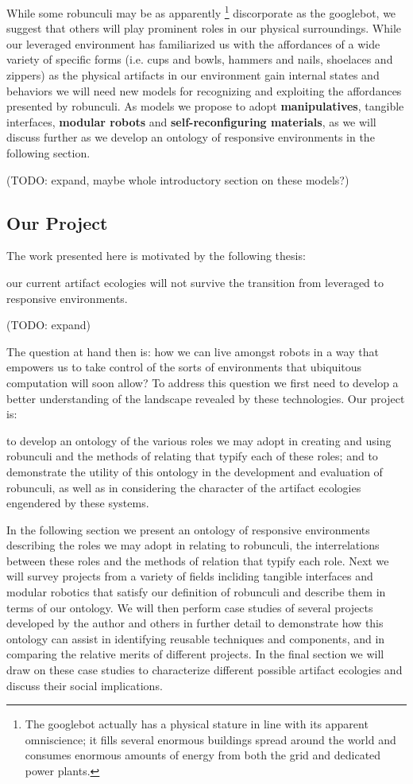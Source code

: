 While some robunculi may be as apparently%
\footnote{The googlebot actually has a physical stature in line with its apparent omniscience; it fills several enormous buildings spread around the world and consumes enormous amounts of energy from both the grid and dedicated power plants.}
discorporate as the googlebot, we suggest that others will play prominent roles in our physical surroundings. While our leveraged environment has familiarized us with the affordances of a wide variety of specific forms (i.e. cups and bowls, hammers and nails, shoelaces and zippers) as the physical artifacts in our environment gain internal states and behaviors we will need new models for recognizing and exploiting the affordances presented by robunculi. As models we propose to adopt \textbf{manipulatives}, tangible interfaces, \textbf{modular robots} and \textbf{self-reconfiguring materials}, as we will discuss further as we develop an ontology of responsive environments in the following section.

(TODO: expand, maybe whole introductory section on these models?)

\subsection{Our Project}
%
The work presented here is motivated by the following thesis:
\begin{em}
our current artifact ecologies will not survive the transition from leveraged to responsive environments.
\end{em}

(TODO: expand)

The question at hand then is: how we can live amongst robots in a way that empowers us to take control of the sorts of environments that ubiquitous computation will soon allow? To address this question we first need to develop a better understanding of the landscape revealed by these technologies. Our project is:
\begin{em}
to develop an ontology of the various roles we may adopt in creating and using robunculi and the methods of relating that typify each of these roles; and to demonstrate the utility of this ontology in the development and evaluation of robunculi, as well as in considering the character of the artifact ecologies engendered by these systems.
\end{em}

In the following section we present an ontology of responsive environments describing the roles we may adopt in relating to robunculi, the interrelations between these roles and the methods of relation that typify each role. Next we will survey projects from a variety of fields incliding tangible interfaces and modular robotics that satisfy our definition of robunculi and describe them in terms of our ontology. We will then perform case studies of several projects developed by the author and others in further detail to demonstrate how this ontology can assist in identifying reusable techniques and components, and in comparing the relative merits of different projects. In the final section we will draw on these case studies to characterize different possible artifact ecologies and discuss their social implications.




